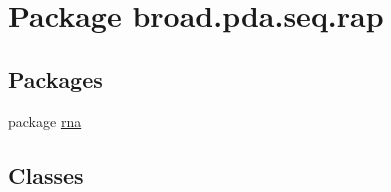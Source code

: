 \hypertarget{namespacebroad_1_1pda_1_1seq_1_1rap}{\section{Package broad.\+pda.\+seq.\+rap}
\label{namespacebroad_1_1pda_1_1seq_1_1rap}
}
\subsection*{Packages}
\begin{DoxyCompactItemize}
\item 
package \hyperlink{namespacebroad_1_1pda_1_1seq_1_1rap_1_1rna}{rna}
\end{DoxyCompactItemize}
\subsection*{Classes}
